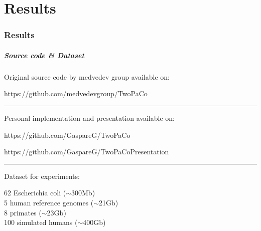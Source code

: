\part{Results}
\section{Results}

\begin{frame}
	\partpage
	\centering
\end{frame}


\begin{frame}
	\frametitle{Source code \& Dataset}
	\centering
	
	Original source code by medvedev group available on:\\
	
	\medskip
	
	{\color{blue}https://github.com/medvedevgroup/TwoPaCo} \\
	
	\medskip
  \noindent\rule{4cm}{0.4pt}
	\medskip
	
	Personal implementation and presentation available on:\\
	\medskip

	{\color{blue}https://github.com/GaspareG/TwoPaCo}

	\medskip
	
	{\color{blue}https://github.com/GaspareG/TwoPaCoPresentation}
	
	\medskip
  \noindent\rule{4cm}{0.4pt}
	\medskip
		
	Dataset for experiments:

	\medskip
	
	62 Escherichia coli ({\color{green}$\sim$300Mb})\\
	5 human reference genomes ({\color{orange}$\sim$21Gb})\\
  8 primates ({\color{orange}$\sim$23Gb})\\
  100 simulated humans ({\color{red}$\sim$400Gb})
	
	
\end{frame}


